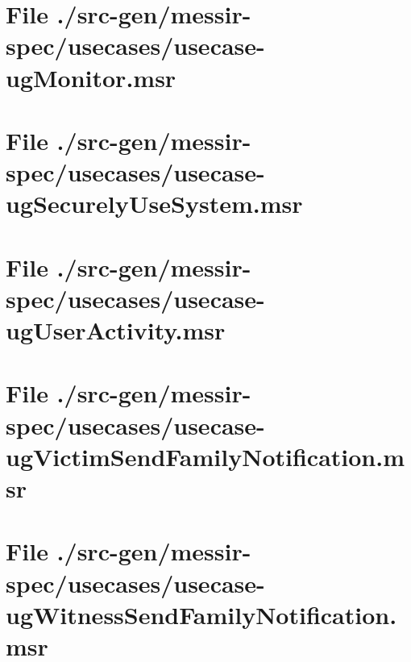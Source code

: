\section[File /src-gen/messir-spec/usecases/usecase-ugMonitor.msr]{File ./src-gen/messir-spec/usecases/usecase-ugMonitor.msr}
\scriptsize

\normalsize
	
\section[File /src-gen/messir-spec/usecases/usecase-ugSecurelyUseSystem.msr]{File ./src-gen/messir-spec/usecases/usecase-ugSecurelyUseSystem.msr}
\scriptsize

\normalsize
	
\section[File /src-gen/messir-spec/usecases/usecase-ugUserActivity.msr]{File ./src-gen/messir-spec/usecases/usecase-ugUserActivity.msr}
\scriptsize

\normalsize
	
\section[File /src-gen/messir-spec/usecases/usecase-ugVictimSendFamilyNotification.msr]{File ./src-gen/messir-spec/usecases/usecase-ugVictimSendFamilyNotification.msr}
\scriptsize

\normalsize
	
\section[File /src-gen/messir-spec/usecases/usecase-ugWitnessSendFamilyNotification.msr]{File ./src-gen/messir-spec/usecases/usecase-ugWitnessSendFamilyNotification.msr}
\scriptsize

\normalsize
	

